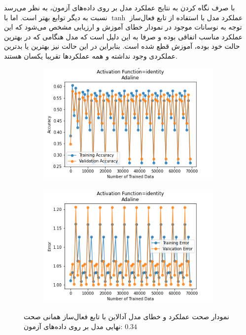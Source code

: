 \documentclass[12pt, a4paper]{article}
\begin{document}
با صرف نگاه کردن به نتایج عملکرد مدل بر روی داده‌های آزمون، به نظر می‌رسد عملکرد مدل با استفاده از
تابع فعال‌ساز $\tanh$ نسبت به دیگر توابع بهتر است. اما با توجه به نوسانات موجود در نمودار‌ خطای
آموزش و ارزیابی مشخص می‌شود که این عملکرد مناسب اتفاقی بوده و صرفا به این دلیل است که مدل هنگامی که در
بهترین حالت خود بوده، آموزش قطع شده است. بنابراین در این حالت نیز بهترین یا بدترین عملکردی وجود نداشته
و همه عملکرد‌ها تقریبا یکسان هستند.

\vspace{1cm}

\begin{figure}[h]
    \begin{subfigure}{0.45\linewidth}
        \centering
        \includegraphics[width=\linewidth]{images/5/adaline/activation_func/identity_acc.png}
    \end{subfigure}
    \hfil
    \begin{subfigure}{0.45\linewidth}
        \centering
        \includegraphics[width=\linewidth]{images/5/adaline/activation_func/identity_error.png}
    \end{subfigure}
    \caption{نمودار صحت عملکرد‌ و خطای مدل آدالاین با تابع فعال‌ساز همانی
    \newline
    صحت نهایی مدل بر روی داده‌های آزمون: $0.34$}
\end{figure}
\end{document}
